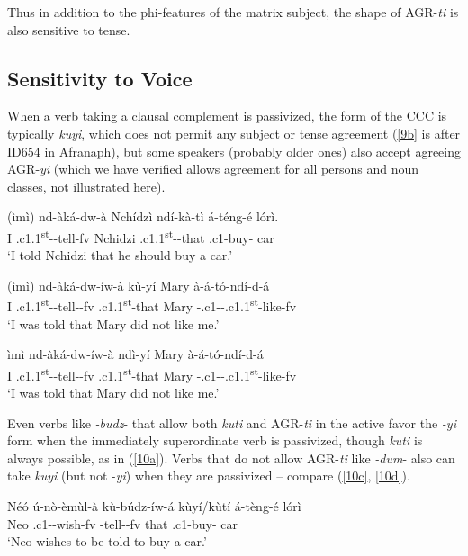 \documentclass[output=paper,
modfonts
]{langscibook}
\begin{document}
Thus in addition to the phi-features of the matrix subject, the shape of AGR-\textit{ti} is also sensitive to tense.

\subsection{Sensitivity to Voice}

When a verb taking a clausal complement is passivized, the form of the CCC is typically \textit{kuyi}, which does not permit any subject or tense agreement (\ref{9b} is after ID654 in Afranaph), but some speakers (probably older ones) also accept agreeing AGR-\textit{yi} (which we have verified allows agreement for all persons and noun classes, not illustrated here).

\ea  
\ea \label{9a} \gll	(ìmì) nd-àká-dw-à Nchídzì ndí-kà-tì á-téng-é lórì.\\
	I .c1.1\textsuperscript{st}--tell-fv Nchidzi .c1.1\textsuperscript{st}--that .c1-buy-	car\\
	\glt `I told Nchidzi that he should buy a car.'

\ex \label{9b} \gll (ìmì) nd-àká-dw-íw-à   kù-yí     Mary à-á-tó-ndí-d-á\\
     	 I  .c1.1\textsuperscript{st}--tell--fv .c1.1\textsuperscript{st}-that Mary
         -.c1--.c1.1\textsuperscript{st}-like-fv\\
     \glt `I was told that Mary did not like me.'

\ex \label{9c} \gll ìmì nd-àká-dw-íw-à  ndì-yí Mary à-á-tó-ndí-d-á\\
         I .c1.1\textsuperscript{st}--tell--fv .c1.1\textsuperscript{st}-that Mary
         -.c1--.c1.1\textsuperscript{st}-like-fv\\
      	\glt `I was told that Mary did not like me.'	
\z \z

Even verbs like \textit{-budz}- that allow both \textit{kuti} and AGR-\textit{ti} in the active favor the \textit{-yi} form when the immediately superordinate verb is passivized, though \textit{kuti} is always possible, as in (\ref{10a}).  Verbs that do not allow AGR-\textit{ti} like \textit{-dum}- also can take \textit{kuyi} (but not -\textit{yi})  when they are passivized -- compare (\ref{10c}, \ref{10d}).

\ea
\ea \label{10a} \gll Néó ú-nò-èmùl-à kù-búdz-íw-á kùyí/kùtí	á-tèng-é lórì\\
	Neo	.c1--wish-fv	-tell--fv	that	.c1-buy-	car\\
	\glt `Neo wishes to be told to buy a car.' 
\end{document}
